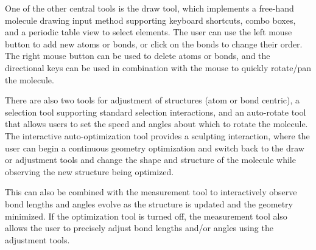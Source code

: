 \documentclass[10pt]{bmc_article}
\newenvironment{bmcformat}{\begin{raggedright}
\baselineskip20pt\sloppy\setboolean{publ}{false}}{\end{raggedright}
\baselineskip20pt\sloppy}
\begin{document}
\begin{bmcformat}
One of the other central tools is the draw tool, which implements a free-hand
molecule drawing input method supporting keyboard shortcuts, combo boxes, and a
periodic table view to select elements. The user can use the left mouse button
to add new atoms or bonds, or click on the bonds to change their order. The
right mouse button can be used to delete atoms or bonds, and the directional keys
can be used in combination with the mouse to quickly rotate/pan the molecule.

There are also two tools for adjustment of structures (atom or bond centric), a
selection tool supporting standard selection interactions, and an auto-rotate
tool that allows users to set the speed and angles about which to rotate the
molecule. The interactive auto-optimization tool provides a sculpting
interaction, where the user can begin a continuous geometry optimization and
switch back to the draw or adjustment tools and change the shape and structure
of the molecule while observing the new structure being optimized.

This can also be combined with the measurement tool to interactively observe
bond lengths and angles evolve as the structure is updated and the geometry
minimized. If the optimization tool is turned off, the measurement tool also
allows the user to precisely adjust bond lengths and/or angles using the
adjustment tools.


\end{bmcformat}
\end{document}
